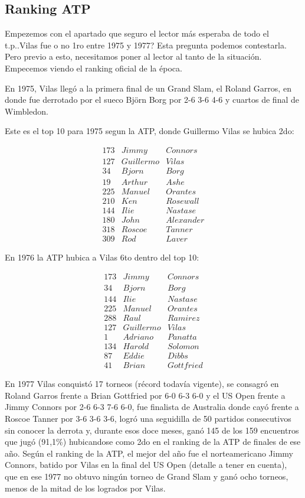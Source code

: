 \subsection{Ranking ATP}

Empezemos con el apartado que seguro el lector más esperaba de todo el t.p..Vilas fue o no 1ro entre 1975 y 1977? Esta pregunta podemos contestarla. Pero previo a esto, necesitamos poner al lector al tanto de la situación. Empecemos viendo el ranking oficial de la época.


En 1975, Vilas llegó a la primera final de un Grand Slam, el Roland Garros, en donde fue derrotado por el sueco Björn Borg por 2-6 3-6 4-6
y cuartos de final de Wimbledon.


Este es el top 10 para 1975 segun la ATP, donde Guillermo Vilas se hubica 2do:

\begin{eqnarray*}
173 & Jimmy & Connors \\
127 & Guillermo & Vilas \\
34 & Bjorn & Borg \\
19 & Arthur & Ashe \\
225 & Manuel & Orantes \\
210 & Ken & Rosewall \\
144 & Ilie & Nastase \\
180 & John & Alexander \\
318 & Roscoe & Tanner \\
309 & Rod & Laver 
\end{eqnarray*}

En 1976 la ATP hubica a Vilas 6to dentro del top 10:

\begin{eqnarray*}
173 & Jimmy & Connors \\
34 & Bjorn & Borg \\
144 & Ilie & Nastase \\
225 & Manuel & Orantes \\
288 & Raul & Ramirez \\
127 & Guillermo & Vilas \\
1 & Adriano & Panatta \\
134 & Harold & Solomon \\
87 & Eddie & Dibbs \\
41 & Brian & Gottfried 
\end{eqnarray*}

En 1977 Vilas conquistó 17 torneos (récord todavía vigente), se consagró en Roland Garros frente a Brian Gottfried por 6-0 6-3 6-0 y el US Open frente a Jimmy Connors por 2-6 6-3 7-6 6-0, fue finalista de Australia donde cayó frente a Roscoe Tanner por 3-6 3-6 3-6, logró una seguidilla de 50 partidos consecutivos sin conocer la derrota y, durante esos doce meses, ganó 145 de los 159 encuentros que jugó (91,1\%) hubicandose como 2do en el ranking de la ATP de finales de ese año.
Según el ranking de la ATP, el mejor del año fue el norteamericano Jimmy Connors, batido por Vilas en la final del US Open (detalle a tener en cuenta), que en ese 1977 no obtuvo ningún torneo de Grand Slam y ganó ocho torneos, menos de la mitad de los logrados por Vilas.  

